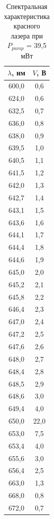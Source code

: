 \documentclass[a4paper,12pt]{report}
\begin{document}
\begin{table}[H]
\begin{tabular}{|c|c|}
\hline
$\lambda$, нм & $V$, В \\ \hline
600,0      & 0,6  \\ \hline
624,0      & 0,6  \\ \hline
632,5      & 0,7  \\ \hline
636,0      & 0,8  \\ \hline
638,0      & 0,9  \\ \hline
639,5      & 1,0  \\ \hline
640,5      & 1,1  \\ \hline
641,5      & 1,2  \\ \hline
642,0      & 1,3  \\ \hline
642,7      & 1,4  \\ \hline
643,1      & 1,5  \\ \hline
643,6      & 1,6  \\ \hline
644,1      & 1,7  \\ \hline
644,4      & 1,8  \\ \hline
644,6      & 1,9  \\ \hline
645,0      & 2,0  \\ \hline
645,2      & 2,1  \\ \hline
645,8      & 2,2  \\ \hline
646,4      & 2,3  \\ \hline
647,0      & 2,4  \\ \hline
647,2      & 2,5  \\ \hline
647,6      & 2,6  \\ \hline
648,0      & 2,7  \\ \hline
648,4      & 2,8  \\ \hline
648,5      & 2,9  \\ \hline
648,6      & 3,0  \\ \hline
649,4      & 4,0  \\ \hline
650,0      & 22,0 \\ \hline
653,0      & 7,5  \\ \hline
653,4      & 4,0  \\ \hline
655,6      & 3,0  \\ \hline
656,4      & 2,5  \\ \hline
663,0      & 1,3  \\ \hline
668,0      & 0,8  \\ \hline
672,0      & 0,7  \\ \hline
\end{tabular}
\caption{Спектральная характеристика красного лазера при $P_{pump}$ = 39,5 мВт}
\label{tab.11}
\end{table}
\end{document}
